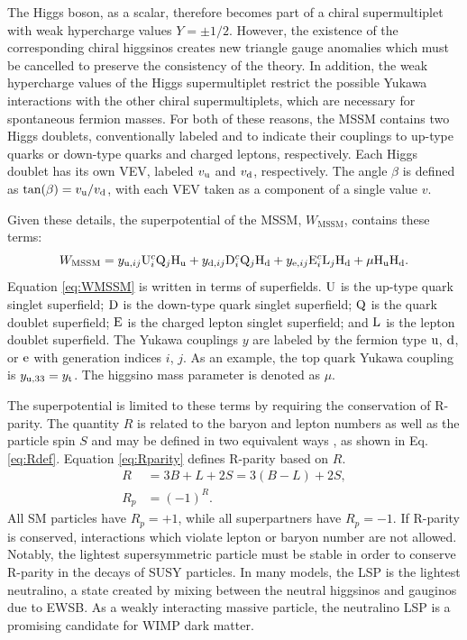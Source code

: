 The Higgs boson, as a scalar, therefore becomes part of a chiral supermultiplet with weak hypercharge values $Y = \pm 1/2$. However, the existence of the corresponding chiral higgsinos creates new triangle gauge anomalies which must be cancelled to preserve the consistency of the theory. In addition, the weak hypercharge values of the Higgs supermultiplet restrict the possible Yukawa interactions with the other chiral supermultiplets, which are necessary for spontaneous fermion masses. For both of these reasons, the MSSM contains two Higgs doublets, conventionally labeled \Hone and \Htwo to indicate their couplings to up-type quarks or down-type quarks and charged leptons, respectively. Each Higgs doublet has its own VEV, labeled $v_{\mathrm{u}}$ and $v_{\mathrm{d}}$, respectively. The angle $\beta$ is defined as $\text{tan}(\beta) = v_{\mathrm{u}}/v_{\mathrm{d}}$, with each VEV taken as a component of a single value $v$.

Given these details, the superpotential of the MSSM, $W_{\text{MSSM}}$, contains these terms:
\begin{equation}
W_{\text{MSSM}} = y_{\mathrm{u},ij}\mathrm{U}_{i}^{c}\mathrm{Q}_{j}\mathrm{H}_\mathrm{u} + y_{\mathrm{d},ij}\mathrm{D}_{i}^{c}\mathrm{Q}_{j}\mathrm{H}_\mathrm{d} + y_{\mathrm{e},ij}\mathrm{E}_{i}^{c}\mathrm{L}_{j}\mathrm{H}_\mathrm{d} + \mu \mathrm{H}_\mathrm{u} \mathrm{H}_\mathrm{d}. \label{eq:WMSSM}
\end{equation}
Equation \eqref{eq:WMSSM} is written in terms of superfields. $\mathrm{U}$ is the up-type quark singlet superfield; $\mathrm{D}$ is the down-type quark singlet superfield; $\mathrm{Q}$ is the quark doublet superfield; $\mathrm{E}$ is the charged lepton singlet superfield; and $\mathrm{L}$ is the lepton doublet superfield. The Yukawa couplings $y$ are labeled by the fermion type $\mathrm{u}$, $\mathrm{d}$, or $\mathrm{e}$ with generation indices $i$, $j$. As an example, the top quark Yukawa coupling is $y_{\mathrm{u},33} = y_{\mathrm{t}}$. The higgsino mass parameter is denoted as $\mu$.

The superpotential is limited to these terms by requiring the conservation of R-parity. The quantity $R$ is related to the baryon and lepton numbers as well as the particle spin $S$ and may be defined in two equivalent ways \cite{Barbier}, as shown in Eq. \eqref{eq:Rdef}. Equation \eqref{eq:Rparity} defines R-parity based on $R$.
\begin{align}
R &= 3B+L+2S = 3(B-L)+2S, \label{eq:Rdef} \\
R_{p} &= (-1)^{R}. \label{eq:Rparity}
\end{align}
All SM particles have $R_{p} = +1$, while all superpartners have $R_{p} = -1$. If R-parity is conserved, interactions which violate lepton or baryon number are not allowed. Notably, the lightest supersymmetric particle must be stable in order to conserve R-parity in the decays of SUSY particles. In many models, the LSP is the lightest neutralino, a state created by mixing between the neutral higgsinos and gauginos due to EWSB. As a weakly interacting massive particle, the neutralino LSP is a promising candidate for WIMP dark matter.

